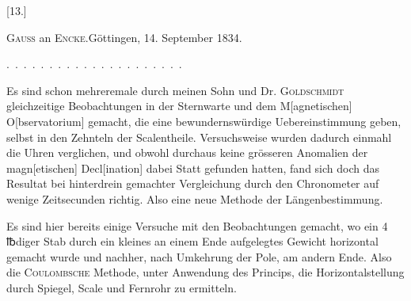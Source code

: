 \clearpage\begingroup{}
\begin{center}[13.]\end{center}
\begin{center}\textsc{Gauss} an \textsc{Encke}.\quad Göttingen, 14. September 1834.\end{center}
\noindent .\ .\ .\ .\ .\ .\ .\ .\ .\ .\ .\ .\ .\ .\ .\ .\ .\ .\ .\ .\ .
\par\noindent\hspace*{\parindent}Es sind schon mehreremale durch meinen Sohn und Dr. \textsc{Goldschmidt}
gleichzeitige Beobachtungen in der Sternwarte und dem M[agnetischen] O[bservatorium]
gemacht, die eine bewundernswürdige Uebereinstimmung geben,
selbst in den Zehnteln der Scalentheile. Versuchsweise wurden dadurch einmahl
die Uhren verglichen, und obwohl durchaus keine grösseren Anomalien
der magn[etischen] Decl[ination] dabei Statt gefunden hatten, fand sich doch
das Resultat bei hinterdrein gemachter Vergleichung durch den Chronometer
auf wenige Zeitsecunden richtig. Also eine neue Methode der Längenbestimmung.

Es sind hier bereits einige Versuche mit den Beobachtungen gemacht,
wo ein 4 {℔}diger Stab durch ein kleines an einem Ende aufgelegtes Gewicht
horizontal gemacht wurde und nachher, nach Umkehrung der Pole, am andern
Ende. Also die \textsc{Coulombsche} Methode, unter Anwendung des Princips, die
Horizontalstellung durch Spiegel, Scale und Fernrohr zu ermitteln.

